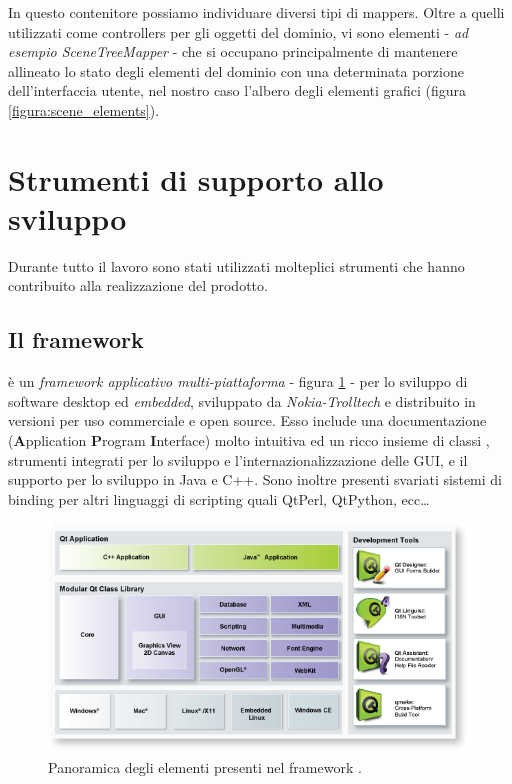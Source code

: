 In questo contenitore possiamo individuare diversi tipi di mappers. Oltre a quelli utilizzati come controllers per gli oggetti del dominio, vi sono elementi - \emph{ad esempio SceneTreeMapper} - che si occupano principalmente di mantenere allineato lo stato degli elementi del dominio con una determinata porzione dell'interfaccia utente, nel nostro caso l'albero degli elementi grafici (figura \ref{figura:scene_elements}).

\section{Strumenti di supporto allo sviluppo}
Durante tutto il lavoro sono stati utilizzati molteplici strumenti che hanno contribuito alla realizzazione del prodotto.

\subsection{Il framework \qt{}}
\qt{} è un \emph{framework applicativo multi-piattaforma} - figura \ref{figura:qtframework} - per lo sviluppo di software desktop ed \emph{embedded}, sviluppato da \emph{Nokia-Trolltech} e distribuito in versioni per uso commerciale e open source. Esso include una documentazione (\textbf{A}pplication \textbf{P}rogram \textbf{I}nterface) molto intuitiva ed un ricco insieme di classi \cpp{}, strumenti integrati per lo sviluppo e l'internazionalizzazione delle GUI, e il supporto per lo sviluppo in Java e C++. Sono inoltre presenti svariati sistemi di binding per altri linguaggi di scripting quali QtPerl, QtPython, ecc\ldots

\begin{figure}[hbt]
	\centering
	\includegraphics[width=12cm]{images/qtframework.png}
	\caption{Panoramica degli elementi presenti nel framework \qt{}.}
	\label{figura:qtframework}
\end{figure}

